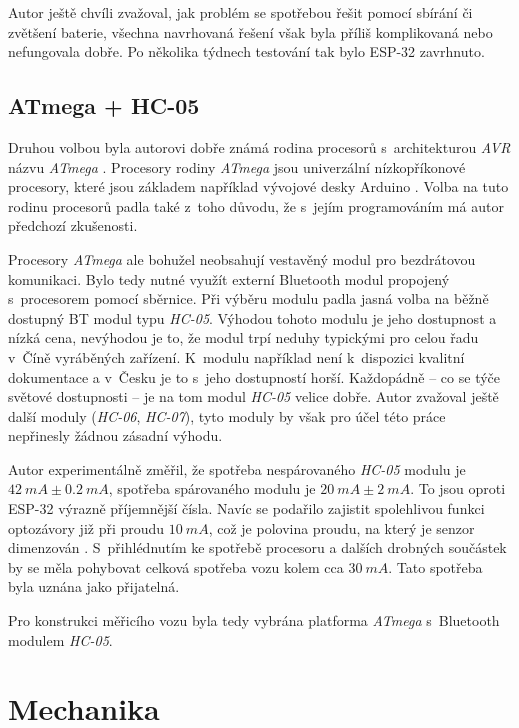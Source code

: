 Autor ještě chvíli zvažoval, jak problém se spotřebou řešit pomocí sbírání či
zvětšení baterie, všechna navrhovaná řešení však byla příliš komplikovaná nebo
nefungovala dobře. Po několika týdnech testování tak bylo ESP-32 zavrhnuto.

\subsection{ATmega + HC-05}
\label{subsec:wsm-atmega}

Druhou volbou byla autorovi dobře známá rodina procesorů s~architekturou
\textit{AVR} názvu \textit{ATmega} \cite{avr}. Procesory rodiny \textit{ATmega}
jsou univerzální nízkopříkonové procesory, které jsou základem například
vývojové desky Arduino \cite{arduino}. Volba na tuto rodinu procesorů padla
také z~toho důvodu, že s~jejím programováním má autor předchozí zkušenosti.

Procesory \textit{ATmega} ale bohužel neobsahují vestavěný modul pro
bezdrátovou komunikaci.  Bylo tedy nutné využít externí Bluetooth modul
propojený s~procesorem pomocí sběrnice. Při výběru modulu padla jasná volba na
běžně dostupný BT modul typu \textit{HC-05}. Výhodou tohoto modulu je jeho
dostupnost a nízká cena, nevýhodou je to, že modul trpí neduhy typickými pro
celou řadu v~Číně vyráběných zařízení. K~modulu například není k~dispozici
kvalitní dokumentace a v~Česku je to s~jeho dostupností horší. Každopádně
-- co se týče světové dostupnosti -- je na tom modul \textit{HC-05} velice
dobře. Autor zvažoval ještě další moduly (\textit{HC-06}, \textit{HC-07}), tyto
moduly by však pro účel této práce nepřinesly žádnou zásadní výhodu.

Autor experimentálně změřil, že spotřeba nespárovaného \textit{HC-05} modulu je
$42\ mA \pm 0.2\ mA$, spotřeba spárovaného modulu je $20\ mA \pm 2\ mA$. To
jsou oproti ESP-32 výrazně příjemnější čísla. Navíc se podařilo zajistit
spolehlivou funkci optozávory již při proudu $10\ mA$, což je polovina proudu,
na který je senzor dimenzován \cite{gp1s23:datasheet}. S~přihlédnutím ke
spotřebě procesoru a dalších drobných součástek by se měla pohybovat celková
spotřeba vozu kolem cca $30\ mA$. Tato spotřeba byla uznána jako přijatelná.

Pro konstrukci měřicího vozu byla tedy vybrána platforma \textit{ATmega}
s~Bluetooth modulem \textit{HC-05}.

\section{Mechanika}
\label{sec:wsm-mech}

